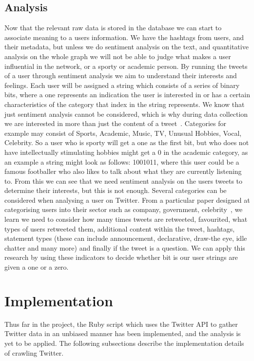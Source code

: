 \documentclass[a4paper]{article}
\begin{document}
\subsection{Analysis}
\label{subsec:designanalysis}
Now that the relevant raw data is stored in the database we can start to associate meaning to a users information. We have the hashtags from users, and their metadata, but unless we do sentiment analysis on the text, and quantitative analysis on the whole graph we will not be able to judge what makes a user influential in the network, or a sporty or academic person. By running the tweets of a user through sentiment analysis we aim to understand their interests and feelings. Each user will be assigned a string which consists of a series of binary bits, where a one represents an indication the user is interested in or has a certain characteristics of the category that index in the string represents. We know that just sentiment analysis cannot be considered, which is why during data collection we are interested in more than just the content of a tweet~\cite{BravoMarquezF2013Combining}. Categories for example may consist of Sports, Academic, Music, TV, Unusual Hobbies, Vocal, Celebrity. So a user who is sporty will get a one as the first bit, but who does not have intellectually stimulating hobbies might get a 0 in the academic category, as an example a string might look as follows: 1001011, where this user could be a famous footballer who also likes to talk about what they are currently listening to. From this we can see that we need sentiment analysis on the users tweets to determine their interests, but this is not enough. Several categories can be considered when analysing a user on Twitter. From a particular paper designed at categorising users into their sector such as company, government, celebrity~\cite{hashtagwearefollowers}, we learn we need to consider how many times tweets are retweeted, favourited, what types of users retweeted them, additional content within the tweet, hashtags, statement types (these can include announcement, declarative, draw-the eye, idle chatter and many more) and finally if the tweet is a question. We can apply this research by using these indicators to decide whether bit is our user strings are given a one or a zero.

\section{Implementation}
\label{sec:implementation}
Thus far in the project, the Ruby script which uses the Twitter API to gather Twitter data in an unbiased manner has been implemented, and the analysis is yet to be applied. The following subsections describe the implementation details of crawling Twitter. 
\end{document}
